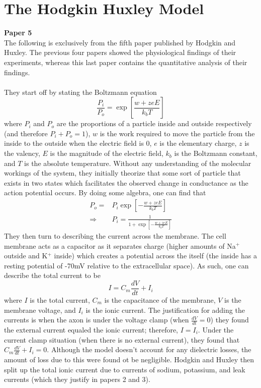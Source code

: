 \documentclass{article}
\newcommand{\od}[2]{\frac{d #1}{d #2}}
\numberwithin{equation}{section}
\begin{document}
\section{The Hodgkin Huxley Model}
\textbf{Paper 5}\\
The following is exclusively from the fifth paper published by Hodgkin and Huxley. The previous four papers showed the physiological findings of their experiments, whereas this last paper contains the quantitative analysis of their findings. \\\\
They start off by stating the Boltzmann equation 
\begin{equation}
    \frac{P_i}{P_o} = \exp\left[ \frac{w+z e E}{k_bT}\right]
\end{equation}
where $P_i$ and $P_o$ are the proportions of a particle inside and outside respectively (and therefore $P_i+P_o =1$), $w$ is the work required to move the particle from the inside to the outside when the electric field is 0, $e$ is the elementary charge, $z$ is the valency, $E$ is the magnitude of the electric field, $k_b$ is the Boltzmann constant, and $T$ is the absolute temperature. Without any understanding of the molecular workings of the system, they initially theorize that some sort of particle that exists in two states which facilitates the observed change in conductance as the action potential occurs. By doing some algebra, one can find that 
\begin{equation*} 
\begin{split}
    P_o = &P_i \exp\left[- \frac{w+z e E}{k_bT}\right]\\
    \Rightarrow &P_i = \frac{1}{1+\exp\left[ -\frac{w+z e E}{k_bT}\right]}
\end{split}
\end{equation*}
They then turn to describing the current across the membrane. The cell membrane acts as a capacitor as it separates charge (higher amounts of Na$^+$ outside and K$^+$ inside) which creates a potential across the itself (the inside has a resting potential of -70mV relative to the extracellular space). As such, one can describe the total current to be 
\begin{equation}
    I=C_m \od{V}{t} + I_i
\end{equation}
where $I$ is the total current, $C_m$ is the capacitance of the membrane, $V$ is the membrane voltage, and $I_i$ is the ionic current. The justification for adding the currents is when the axon is under the voltage clamp (when $\od{V}{t} = 0$) they found the external current equaled the ionic current; therefore, $I=I_i$. Under the current clamp situation (when there is no external current), they found that $C_m \od{V}{t} + I_i=0$. Although the model doesn't account for any dielectric losses, the amount of loss due to this were found ot be negligible. Hodgkin and Huxley then split up the total ionic current due to currents of sodium, potassium, and leak currents (which they justify in papers 2 and 3).
\end{document}
